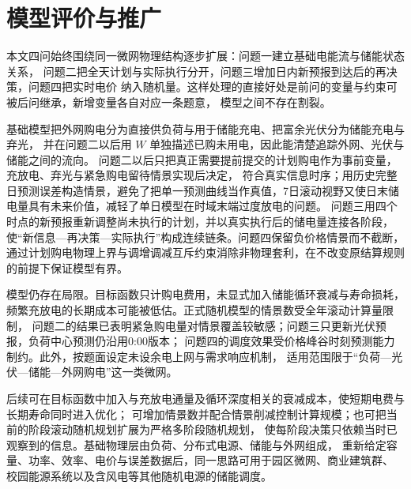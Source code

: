 \section{模型评价与推广}

本文四问始终围绕同一微网物理结构逐步扩展：问题一建立基础电能流与储能状态关系，
问题二把全天计划与实际执行分开，问题三增加日内新预报到达后的再决策，问题四把实时电价
纳入随机量。这样处理的直接好处是前问的变量与约束可被后问继承，新增变量各自对应一条题意，
模型之间不存在割裂。

基础模型把外网购电分为直接供负荷与用于储能充电、把富余光伏分为储能充电与弃光，
并在问题二以后用 \(W\) 单独描述已购未用电，因此能清楚追踪外网、光伏与储能之间的流向。
问题二以后只把真正需要提前提交的计划购电作为事前变量，充放电、弃光与紧急购电留待情景实现后决定，
符合真实信息时序；用历史完整日预测误差构造情景，避免了把单一预测曲线当作真值，7日滚动视野又使日末储电量具有未来价值，减轻了单日模型在时域末端过度放电的问题。
问题三用四个时点的新预报重新调整尚未执行的计划，并以真实执行后的储电量连接各阶段，
使“新信息—再决策—实际执行”构成连续链条。问题四保留负价格情景而不截断，
通过计划购电物理上界与调增调减互斥约束消除非物理套利，在不改变原结算规则的前提下保证模型有界。

模型仍存在局限。目标函数只计购电费用，未显式加入储能循环衰减与寿命损耗，
频繁充放电的长期成本可能被低估。正式随机模型的情景数受全年滚动计算量限制，
问题二的结果已表明紧急购电量对情景覆盖较敏感；问题三只更新光伏预报，负荷中心预测仍沿用0:00版本；
问题四的调度效果受价格峰谷时刻预测能力制约。此外，按题面设定未设余电上网与需求响应机制，
适用范围限于“负荷—光伏—储能—外网购电”这一类微网。

后续可在目标函数中加入与充放电通量及循环深度相关的衰减成本，使短期电费与长期寿命同时进入优化；
可增加情景数并配合情景削减控制计算规模；也可把当前的阶段滚动随机规划扩展为严格多阶段随机规划，
使每阶段决策只依赖当时已观察到的信息。基础物理层由负荷、分布式电源、储能与外网组成，
重新给定容量、功率、效率、电价与误差数据后，同一思路可用于园区微网、商业建筑群、
校园能源系统以及含风电等其他随机电源的储能调度。
